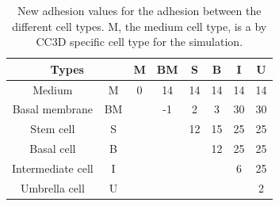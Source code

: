 \begin{table}[ht]
\centering
\caption[New adhesion values for the different cell types]{New adhesion values for the adhesion between the different cell types. M, the medium cell type, is a by \ac{CC3D} specific cell type for the simulation.\newline}
\renewcommand{\arraystretch}{1.5}
	\begin{tabular}{|c|c||c|c|c|c|c|c|}
	\hline
		\multicolumn{2}{|c||}{Types} & M & BM & S & B & I & U \\
		\hline
		\hline
		
		Medium & M & 0 & 14 & 14 & 14 & 14 & 14 \\
		\hline
		Basal membrane & BM & & -1 & 2 & 3 & 30 & 30 \\
		\hline
		Stem cell & S & & & 12 & 15 & 25 & 25 \\
		\hline
		Basal cell & B & & & & 12 & 25 & 25 \\
		\hline
		Intermediate cell & I & & & & & 6 & 25 \\
		\hline
		Umbrella cell & U & & & & & & 2
\tabularnewline
\hline 
	\end{tabular}
	\label{tbl:NewAdhesion}
\end{table}


